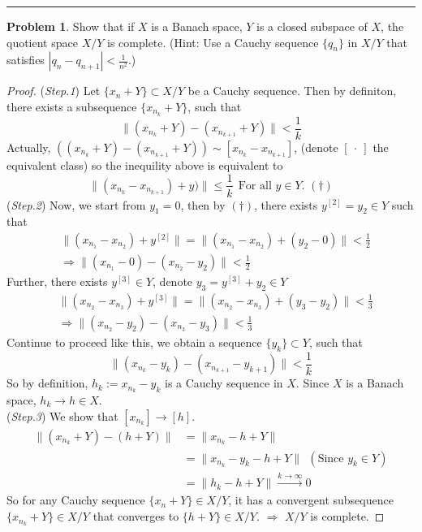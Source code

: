 \documentclass[a4paper, 10pt]{article}
\theoremstyle{definition}
\newtheorem{problem}{Problem}
\theoremstyle{hSol}
\begin{document}
\noindent\rule{16cm}{0.4pt}
\begin{problem} Show that if $X$ is a Banach space, $Y$ is a closed subspace of $X$, the quotient space $X/Y$ is complete. (Hint: Use a Cauchy sequence $\{q_n\}$ in $X/Y$ that satisfies $|q_n-q_{n+1}|<\frac{1}{n^2}$.)
\end{problem}
\begin{proof} (\textit{Step.1}) Let $\{x_n +Y\} \subset X/Y$ be a Cauchy sequence. Then by definiton, there exists a subsequence $\{x_{n_k} +Y\}$, such that
\begin{equation}
  \|(x_{n_k}+Y) - (x_{n_{k+1}}+Y)\|  < \frac{1}{k}
\end{equation}
Actually, $((x_{n_k}+Y) - (x_{n_{k+1}}+Y)) \sim [x_{n_k}-x_{n_{k+1}}]$, (denote $[~\cdot~]$ the equivalent class) so the inequility above is equivalent to
\begin{equation}
  \|(x_{n_k} - x_{n_{k+1}})+y)\| \leq \frac{1}{k}~~\text{For all $y\in Y$. $(\dag)$}
\end{equation}
(\textit{Step.2}) Now, we start from $y_1=0$, then by $(\dag)$, there exists $y^{[2]}=y_2\in Y$ such that
\begin{equation}
  \begin{split}
    &\|(x_{n_1} - x_{n_{2}})+y^{[2]}\| = \|(x_{n_1} - x_{n_{2}})+(y_2 - 0)\| < \frac{1}{2} \\
    &\Rightarrow \|(x_{n_1} - 0)-(x_{n_{2}}-y_2)\| < \frac{1}{2}
  \end{split}
\end{equation}
Further, there exists $y^{[3]}\in Y$, denote $y_3=y^{[3]}+y_2 \in Y$
\begin{equation}
  \begin{split}
    &\|(x_{n_2} - x_{n_3})+y^{[3]}\| = \|(x_{n_2} - x_{n_3})+(y_3 - y_2)\| < \frac{1}{3} \\
    &\Rightarrow \|(x_{n_2} - y_2)-(x_{n_{3}}-y_3)\| < \frac{1}{3}
  \end{split}
\end{equation}
Continue to proceed like this, we obtain a sequence $\{y_k\}\subset Y$, such that 
\begin{equation}
  \|(x_{n_k} - y_k)-(x_{n_{k+1}}-y_{k+1})\| < \frac{1}{k}
\end{equation}
So by definition, $h_k:=x_{n_k}-y_k$ is a Cauchy sequence in $X$. Since $X$ is a Banach space, $h_k \to h\in X$. \\
(\textit{Step.3}) We show that $[x_{n_k}] \to [h]$.
\begin{equation}
  \begin{split}
    \|(x_{n_k}+Y)-(h+Y)\| &= \|x_{n_k}-h+Y\|\\
    &= \|x_{n_k}-y_k-h+Y\| ~~(\text{Since $y_k \in Y$})\\
    &= \|h_k-h+Y\| \xrightarrow{k\to \infty} 0
  \end{split}
\end{equation}
So for any Cauchy sequence $\{x_n +Y\}\in X/ Y$, it has a convergent subsequence $\{x_{n_k}+Y\}\in X/Y$ that converges to $\{h+Y\}\in X/Y$. $\Rightarrow$ $X/Y$ is complete.
\end{proof} 
\end{document}

